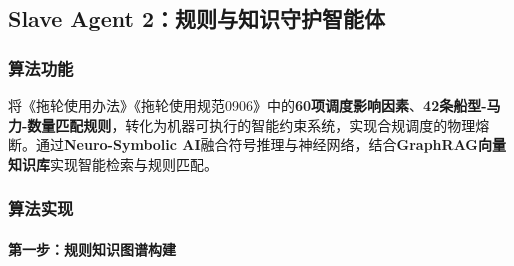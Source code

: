 \documentclass[12pt,a4paper]{article}
\begin{document}
\subsection{Slave Agent 2：规则与知识守护智能体}

\subsubsection{算法功能}

将《拖轮使用办法》《拖轮使用规范0906》中的\textbf{60项调度影响因素}、\textbf{42条船型-马力-数量匹配规则}，转化为机器可执行的智能约束系统，实现合规调度的物理熔断。通过\textbf{Neuro-Symbolic AI}融合符号推理与神经网络，结合\textbf{GraphRAG向量知识库}实现智能检索与规则匹配。

\subsubsection{算法实现}

\paragraph{第一步：规则知识图谱构建}
\end{document}
